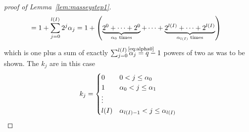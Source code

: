 \begin{proof}[proof of Lemma~\ref{lem:masseystep1}]
\begin{align*}
    &= 1 + \sum_{j=0}^{l(I)}2^j\alpha_j
    = 1 + \left(
      \underbrace{2^0 +\dotsb+ 2^0}_{\text{$\alpha_0$ times}}
      + \dotsb
      + \underbrace{2^{l(I)}+\dotsb+2^{l(I)}}_{\text{$\alpha_{l(I)}$ times}}
      \right)
  \end{align*}
  which is one plus a sum of exactly
  $\sum_{j=0}^{\l(I)}\alpha_j\cequalsby{\eqref{eq:alpha0}} q-1$
  powers of two as was to be shown.
  The $k_j$ are in this case
  \begin{gather*}
    k_j = \begin{cases}
      0 & 0< j\leq \alpha_0\\
      1 & \alpha_0< j\leq \alpha_1\\
      \vdots\\
      l(I) & \alpha_{l(I)-1}<j\leq \alpha_{l(I)}
    \end{cases}
    \qedhere
  \end{gather*}
\end{proof}

